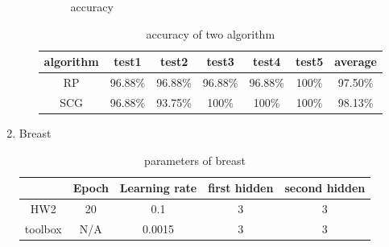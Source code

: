 \documentclass[12pt,a4paper]{article}
\begin{document}
\begin{CJK}{UTF8}{bsmi}
\begin{enumerate}
\begin{enumerate}
\begin{figure}[H]
\begin{subfigure}{.5\textwidth}
	 		\end{subfigure}
	 		\caption{accuracy}
	 		
	 	\end{figure}
	 	
	 	\begin{table}[H]
	 		\caption{accuracy of two algorithm} %
	 		\centering %
	 		\begin{tabular}{c c c c c c c} %
	 			\hline\hline %
	 			algorithm & test1 & test2 & test3 & test4 &test5 & average\\ [0.5ex] %
	 			\hline %
	 			RP & 96.88\% & 96.88\% & 96.88\% & 96.88\% &100\% &97.50\%\\ %
	 			SCG & 96.88\% & 93.75\% & 100\% & 100\% &100\% &98.13\%\\
	 			[0.5ex] %
	 			\hline %
	 		\end{tabular}
	 	\end{table}

	 \end{enumerate}
	 \newpage
	 
	 \item Breast
	 
	  \begin{enumerate}
	 	\begin{table}[H]
	 		\caption{parameters of breast} %
	 		\centering %
	 		\begin{tabular}{c c c c c} %
	 			\hline\hline %
	 			& Epoch & Learning rate & first hidden & second hidden \\ [0.5ex] %
	 			\hline %
	 			HW2 & 20 & 0.1 & 3 & 3\\ %
	 			toolbox & N/A & 0.0015 & 3 & 3\\
	 			[0.5ex] %
	 			\hline %
	 		\end{tabular}
	 		\label{table:nonlin} %
	 	\end{table}


\end{enumerate}
\end{enumerate}
\end{CJK}
\end{document}
